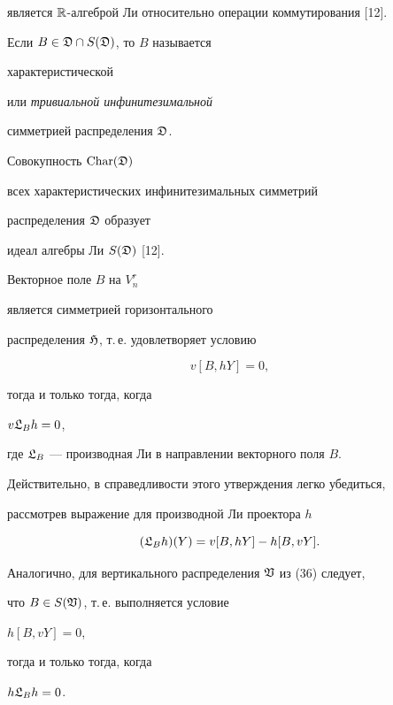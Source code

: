 является $\Bbb R$-алгеброй Ли относительно операции коммутирования [12].


Если $B\in \frak D\cap S(\frak D)$, то $B$ называется {\it


характеристической} или {\it тривиальной инфинитезимальной}


симметрией распределения $\frak D$.


Совокупность $\text{Char}(\frak D)$


всех характеристических инфинитезимальных симметрий


распределения $\frak D$ образует


идеал алгебры Ли $S(\frak D)$ [12].





\begin{note}


Векторное поле $B$ на $V^r_n$


является симметрией горизонтального


распределения $\frak H$, т.\,е. удовлетворяет условию


\begin{equation}


v[B,hY]=0,


\end{equation}


тогда и только тогда, когда


$v \frak {L}_{B}h=0$,


где $\frak {L}_{B}$ --- производная Ли в направлении векторного поля $B$.


Действительно, в справедливости этого утверждения легко убедиться,


рассмотрев выражение для производной Ли проектора $h$


\begin{equation}


( \frak {L}_{B}h)(Y)=v[B,hY]-h[B,vY].


\end{equation}


Аналогично, для вертикального распределения $\frak V$ из (36) следует,


что $B\in S(\frak V)$, т.\,е. выполняется условие


$h[B,vY]=0$,


тогда и только тогда, когда


$h\frak {L}_{B}h=0$.


\end{note}


